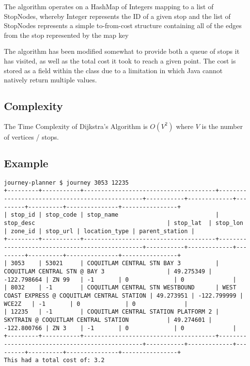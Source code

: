 \documentclass[12pt]{report}
\begin{document}
	The algorithm operates on a HashMap of Integers mapping to a list of StopNodes, whereby Integer represents the ID of a given stop and the list of StopNodes represents a simple to-from-cost structure containing all of the edges from the stop represented by the map key \newline 
	
	The algorithm has been modified somewhat to provide both a queue of stops it has visited, as well as the total cost it took to reach a given point. The cost is stored as a field within the class due to a limitation in which Java cannot natively return multiple values. \newline
	
	\subsection{Complexity}
	The Time Complexity of Dijkstra's Algorithm is $O(V^2)$ where $V$ is the number of vertices / stops.
	
	\subsection{Example}
	\begin{verbatim}
journey-planner $ journey 3053 12235
+---------+-----------+--------------------------------------+------------------------------------------------+-----------+-------------+---------+----------+---------------+----------------+
| stop_id | stop_code | stop_name                            | stop_desc                                      | stop_lat  | stop_lon    | zone_id | stop_url | location_type | parent_station |
+---------+-----------+--------------------------------------+------------------------------------------------+-----------+-------------+---------+----------+---------------+----------------+
| 3053    | 53021     | COQUITLAM CENTRAL STN BAY 3          | COQUITLAM CENTRAL STN @ BAY 3                  | 49.275349 | -122.798664 | ZN 99   | -1       | 0             | 0              |
| 8032    | -1        | COQUITLAM CENTRAL STN WESTBOUND      | WEST COAST EXPRESS @ COQUITLAM CENTRAL STATION | 49.273951 | -122.799999 | WCE2Z   | -1       | 0             | 0              |
| 12235   | -1        | COQUITLAM CENTRAL STATION PLATFORM 2 | SKYTRAIN @ COQUITLAM CENTRAL STATION           | 49.274601 | -122.800766 | ZN 3    | -1       | 0             | 0              |
+---------+-----------+--------------------------------------+------------------------------------------------+-----------+-------------+---------+----------+---------------+----------------+
This had a total cost of: 3.2
	\end{verbatim}
	
\end{document}
